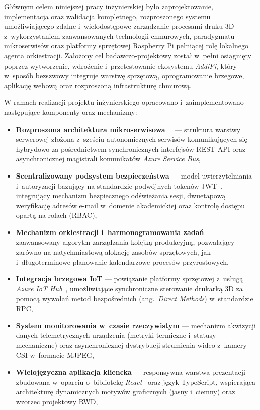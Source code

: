 \documentclass[a4paper,12pt,reqno]{article}
\begin{document}
Głównym celem niniejszej pracy inżynierskiej było zaprojektowanie, implementacja oraz walidacja kompletnego, rozproszonego systemu umożliwiającego zdalne i~wielodostępowe zarządzanie procesami druku 3D z~wykorzystaniem zaawansowanych technologii chmurowych, paradygmatu mikroserwisów oraz platformy sprzętowej Raspberry Pi pełniącej rolę lokalnego agenta orkiestracji. Założony cel badawczo-projektowy został w~pełni osiągnięty poprzez wytworzenie, wdrożenie i~przetestowanie ekosystemu \textit{AddiPi}, który w~sposób bezszwowy integruje warstwę sprzętową, oprogramowanie brzegowe, aplikację webową oraz rozproszoną infrastrukturę chmurową.

W ramach realizacji projektu inżynierskiego opracowano i~zaimplementowano następujące komponenty oraz mechanizmy:
\begin{itemize}
	\item \textbf{Rozproszona architektura mikroserwisowa}~\cite{richardson2020}~\cite{newman2022} --- struktura warstwy serwerowej złożona z~sześciu autonomicznych serwisów komunikujących się hybrydowo za pośrednictwem synchronicznych interfejsów REST API oraz asynchronicznej magistrali komunikatów \textit{Azure Service Bus},
	\item \textbf{Scentralizowany podsystem bezpieczeństwa} --- model uwierzytelniania i~autoryzacji bazujący na standardzie podwójnych tokenów JWT~\cite{jwt}, integrujący mechanizm bezpiecznego odświeżania sesji, dwuetapową weryfikację adresów e-mail w~domenie akademickiej oraz kontrolę dostępu opartą na rolach (RBAC),
	\item \textbf{Mechanizm orkiestracji i~harmonogramowania zadań} --- zaawansowany algorytm zarządzania kolejką produkcyjną, pozwalający zarówno na natychmiastową alokację zasobów sprzętowych, jak i~długoterminowe planowanie kalendarzowe procesów przyrostowych,
	\item \textbf{Integracja brzegowa IoT} --- powiązanie platformy sprzętowej z~usługą \textit{Azure IoT Hub}~\cite{iothub}, umożliwiające synchroniczne sterowanie drukarką 3D za pomocą wywołań metod bezpośrednich (ang.~\textit{Direct Methods}) w~standardzie RPC,
	\item \textbf{System monitorowania w~czasie rzeczywistym} --- mechanizm akwizycji danych telemetrycznych urządzenia (metryki termiczne i~statusy mechaniczne) oraz asynchronicznej dystrybucji strumienia wideo z~kamery CSI w~formacie MJPEG,
	\item \textbf{Wielojęzyczna aplikacja kliencka} --- responsywna warstwa prezentacji zbudowana w~oparciu o~bibliotekę \textit{React}~\cite{react} oraz język TypeScript, wspierająca architekturę dynamicznych motywów graficznych (jasny i~ciemny) oraz wzorzec projektowy RWD,

\end{itemize}
\end{document}
